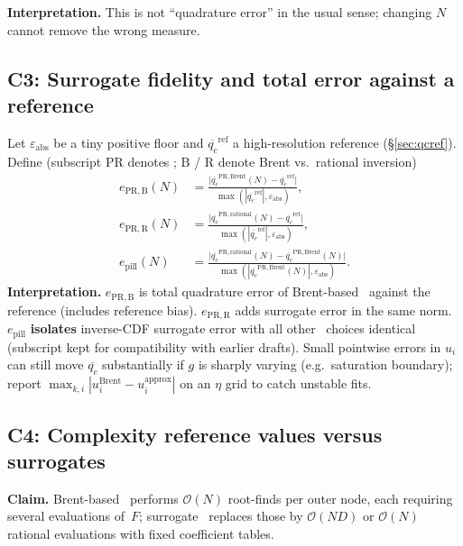 \documentclass[11pt,a4paper]{article}
\begin{document}
\textbf{Interpretation.}
This is not ``quadrature error'' in the usual sense; changing $N$ cannot remove the wrong measure.

\subsection{C3: Surrogate fidelity and total error against a reference}
Let $\varepsilon_{\mathrm{abs}}$ be a tiny positive floor and $\overline{q_c}^{\mathrm{ref}}$ a high-resolution reference (\S\ref{sec:qcref}).
Define (subscript $\mathrm{PR}$ denotes \profileros; $\mathrm{B}$ / $\mathrm{R}$ denote Brent vs.\ rational inversion)
\begin{align}
  e_{\mathrm{PR,B}}(N) &= \frac{\bigl|\overline{q_c}^{\mathrm{PR,Brent}}(N)-\overline{q_c}^{\mathrm{ref}}\bigr|}{\max(|\overline{q_c}^{\mathrm{ref}}|,\varepsilon_{\mathrm{abs}})}, \\
  e_{\mathrm{PR,R}}(N) &= \frac{\bigl|\overline{q_c}^{\mathrm{PR,rational}}(N)-\overline{q_c}^{\mathrm{ref}}\bigr|}{\max(|\overline{q_c}^{\mathrm{ref}}|,\varepsilon_{\mathrm{abs}})}, \\
  e_{\mathrm{pill}}(N) &= \frac{\bigl|\overline{q_c}^{\mathrm{PR,rational}}(N)-\overline{q_c}^{\mathrm{PR,Brent}}(N)\bigr|}{\max(|\overline{q_c}^{\mathrm{PR,Brent}}(N)|,\varepsilon_{\mathrm{abs}})}.
\end{align}
\textbf{Interpretation.}
$e_{\mathrm{PR,B}}$ is total quadrature error of Brent-based \profileros\ against the reference (includes reference bias).
$e_{\mathrm{PR,R}}$ adds surrogate error in the same norm.
$e_{\mathrm{pill}}$ \textbf{isolates} inverse-CDF surrogate error with all other \profileros\ choices identical (subscript kept for compatibility with earlier drafts).
Small pointwise errors in $u_i$ can still move $\overline{q_c}$ substantially if $g$ is sharply varying (e.g.\ saturation boundary); report $\max_{k,i}|u_i^{\mathrm{Brent}}-u_i^{\mathrm{approx}}|$ on an $\eta$ grid to catch unstable fits.

\subsection{C4: Complexity reference values versus surrogates}
\textbf{Claim.}
Brent-based \profileros\ performs $\mathcal{O}(N)$ root-finds per outer node, each requiring several evaluations of~$F$; surrogate \profileros\ replaces those by $\mathcal{O}(ND)$ or $\mathcal{O}(N)$ rational evaluations with fixed coefficient tables.
\end{document}
